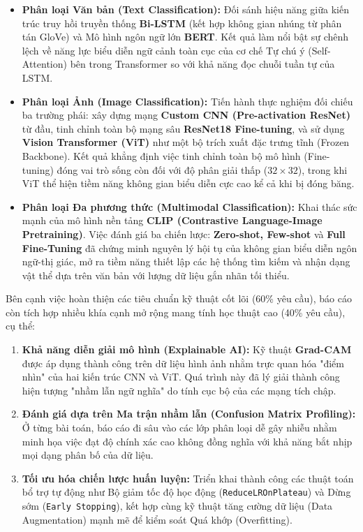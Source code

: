 \documentclass[a4paper]{article}
\theoremstyle{definition}
\begin{document}
\begin{itemize}
	\item \textbf{Phân loại Văn bản (Text Classification):} Đối sánh hiệu năng giữa kiến trúc truy hồi truyền thống \textbf{Bi-LSTM} (kết hợp không gian nhúng từ phân tán GloVe) và Mô hình ngôn ngữ lớn \textbf{BERT}. Kết quả làm nổi bật sự chênh lệch về năng lực biểu diễn ngữ cảnh toàn cục của cơ chế Tự chú ý (Self-Attention) bên trong Transformer so với khả năng đọc chuỗi tuần tự của LSTM.
	\item \textbf{Phân loại Ảnh (Image Classification):} Tiến hành thực nghiệm đối chiếu ba trường phái: xây dựng mạng \textbf{Custom CNN (Pre-activation ResNet)} từ đầu, tinh chỉnh toàn bộ mạng sâu \textbf{ResNet18 Fine-tuning}, và sử dụng \textbf{Vision Transformer (ViT)} như một bộ trích xuất đặc trưng tĩnh (Frozen Backbone). Kết quả khẳng định việc tinh chỉnh toàn bộ mô hình (Fine-tuning) đóng vai trò sống còn đối với độ phân giải thấp ($32 \times 32$), trong khi ViT thể hiện tiềm năng không gian biểu diễn cực cao kể cả khi bị đóng băng.
	\item \textbf{Phân loại Đa phương thức (Multimodal Classification):} Khai thác sức mạnh của mô hình nền tảng \textbf{CLIP (Contrastive Language-Image Pretraining)}. Việc đánh giá ba chiến lược: \textbf{Zero-shot, Few-shot} và \textbf{Full Fine-Tuning} đã chứng minh nguyên lý hội tụ của không gian biểu diễn ngôn ngữ-thị giác, mở ra tiềm năng thiết lập các hệ thống tìm kiếm và nhận dạng vật thể dựa trên văn bản với lượng dữ liệu gắn nhãn tối thiểu.
\end{itemize}

Bên cạnh việc hoàn thiện các tiêu chuẩn kỹ thuật cốt lõi (60\% yêu cầu), báo cáo còn tích hợp nhiều khía cạnh mở rộng mang tính học thuật cao (40\% yêu cầu), cụ thể:
\begin{enumerate}
	\item \textbf{Khả năng diễn giải mô hình (Explainable AI):} Kỹ thuật \textbf{Grad-CAM} được áp dụng thành công trên dữ liệu hình ảnh nhằm trực quan hóa "điểm nhìn" của hai kiến trúc CNN và ViT. Quá trình này đã lý giải thành công hiện tượng "nhầm lẫn ngữ nghĩa" do tính cục bộ của các mạng tích chập.
	\item \textbf{Đánh giá dựa trên Ma trận nhầm lẫn (Confusion Matrix Profiling):} Ở từng bài toán, báo cáo đi sâu vào các lớp phân loại dễ gây nhiễu nhằm minh họa việc đạt độ chính xác cao không đồng nghĩa với khả năng bắt nhịp mọi dạng phân bố của dữ liệu.
	\item \textbf{Tối ưu hóa chiến lược huấn luyện:} Triển khai thành công các thuật toán bổ trợ tự động như Bộ giảm tốc độ học động (\texttt{ReduceLROnPlateau}) và Dừng sớm (\texttt{Early Stopping}), kết hợp cùng kỹ thuật tăng cường dữ liệu (Data Augmentation) mạnh mẽ để kiểm soát Quá khớp (Overfitting).
\end{enumerate}
\end{document}
